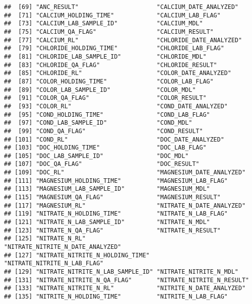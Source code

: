 \documentclass[]{article}
\begin{document}
\begin{verbatim}
##  [69] "ANC_RESULT"                      "CALCIUM_DATE_ANALYZED"          
##  [71] "CALCIUM_HOLDING_TIME"            "CALCIUM_LAB_FLAG"               
##  [73] "CALCIUM_LAB_SAMPLE_ID"           "CALCIUM_MDL"                    
##  [75] "CALCIUM_QA_FLAG"                 "CALCIUM_RESULT"                 
##  [77] "CALCIUM_RL"                      "CHLORIDE_DATE_ANALYZED"         
##  [79] "CHLORIDE_HOLDING_TIME"           "CHLORIDE_LAB_FLAG"              
##  [81] "CHLORIDE_LAB_SAMPLE_ID"          "CHLORIDE_MDL"                   
##  [83] "CHLORIDE_QA_FLAG"                "CHLORIDE_RESULT"                
##  [85] "CHLORIDE_RL"                     "COLOR_DATE_ANALYZED"            
##  [87] "COLOR_HOLDING_TIME"              "COLOR_LAB_FLAG"                 
##  [89] "COLOR_LAB_SAMPLE_ID"             "COLOR_MDL"                      
##  [91] "COLOR_QA_FLAG"                   "COLOR_RESULT"                   
##  [93] "COLOR_RL"                        "COND_DATE_ANALYZED"             
##  [95] "COND_HOLDING_TIME"               "COND_LAB_FLAG"                  
##  [97] "COND_LAB_SAMPLE_ID"              "COND_MDL"                       
##  [99] "COND_QA_FLAG"                    "COND_RESULT"                    
## [101] "COND_RL"                         "DOC_DATE_ANALYZED"              
## [103] "DOC_HOLDING_TIME"                "DOC_LAB_FLAG"                   
## [105] "DOC_LAB_SAMPLE_ID"               "DOC_MDL"                        
## [107] "DOC_QA_FLAG"                     "DOC_RESULT"                     
## [109] "DOC_RL"                          "MAGNESIUM_DATE_ANALYZED"        
## [111] "MAGNESIUM_HOLDING_TIME"          "MAGNESIUM_LAB_FLAG"             
## [113] "MAGNESIUM_LAB_SAMPLE_ID"         "MAGNESIUM_MDL"                  
## [115] "MAGNESIUM_QA_FLAG"               "MAGNESIUM_RESULT"               
## [117] "MAGNESIUM_RL"                    "NITRATE_N_DATE_ANALYZED"        
## [119] "NITRATE_N_HOLDING_TIME"          "NITRATE_N_LAB_FLAG"             
## [121] "NITRATE_N_LAB_SAMPLE_ID"         "NITRATE_N_MDL"                  
## [123] "NITRATE_N_QA_FLAG"               "NITRATE_N_RESULT"               
## [125] "NITRATE_N_RL"                    "NITRATE_NITRITE_N_DATE_ANALYZED"
## [127] "NITRATE_NITRITE_N_HOLDING_TIME"  "NITRATE_NITRITE_N_LAB_FLAG"     
## [129] "NITRATE_NITRITE_N_LAB_SAMPLE_ID" "NITRATE_NITRITE_N_MDL"          
## [131] "NITRATE_NITRITE_N_QA_FLAG"       "NITRATE_NITRITE_N_RESULT"       
## [133] "NITRATE_NITRITE_N_RL"            "NITRITE_N_DATE_ANALYZED"        
## [135] "NITRITE_N_HOLDING_TIME"          "NITRITE_N_LAB_FLAG"             

\end{verbatim}
\end{document}

